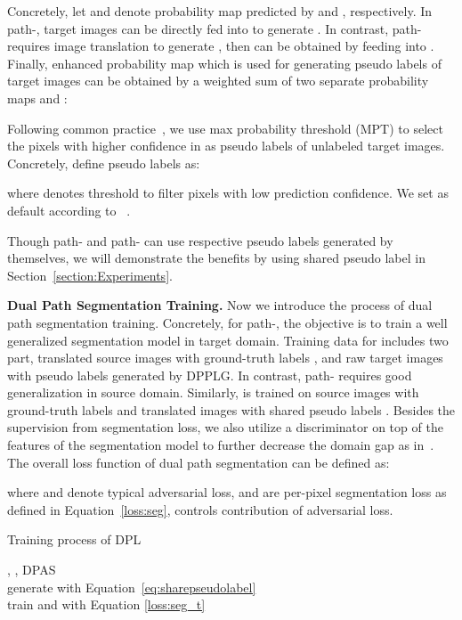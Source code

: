 \documentclass[10pt,twocolumn,letterpaper]{article}
\begin{document}
Concretely, let  and  denote probability map predicted by  and , respectively. In path-, target images can be directly fed into  to generate . In contrast, path- requires image translation to generate , then  can be obtained by feeding  into . Finally, enhanced probability map  which is used for generating pseudo labels of target images can be obtained by a weighted sum of two separate probability maps  and :
\vspace{-0.2cm}

Following common practice~\cite{li2019bidirectional, Two-phase}, we use max probability threshold (MPT) to select the pixels with higher confidence in  as pseudo labels of unlabeled target images. Concretely, define pseudo labels  as:
\vspace{-0.2cm}

where  denotes threshold to filter pixels with low prediction confidence. We set  as default according to ~\cite{li2019bidirectional}.

Though path- and path- can use respective pseudo labels generated by themselves, we will demonstrate the benefits by using shared pseudo label  in Section~\ref{section:Experiments}.

{\noindent \textbf{Dual Path Segmentation Training.}}
Now we introduce the process of dual path segmentation training. Concretely, for path-, the objective is to train a well generalized segmentation model  in target domain. Training data for  includes two part, translated source images  with ground-truth labels , and raw target images  with pseudo labels  generated by DPPLG. In contrast, path- requires good generalization in source domain. Similarly,  is trained on source images  with ground-truth labels  and translated images  with shared pseudo labels . Besides the supervision from segmentation loss, we also utilize a discriminator on top of the features of the segmentation model to further decrease the domain gap as in~\cite{hoffman2018cycada, li2019bidirectional}. The overall loss function of dual path segmentation can be defined as:

where  and  denote typical adversarial loss,  and  are per-pixel segmentation loss as defined in Equation~\ref{loss:seg},  controls contribution of adversarial loss.
\vspace{-0.1cm}
\begin{algorithm}[b]
	\vspace{-0.1cm}
\caption{Training process of DPL}\label{algr:train_proc}
\begin{algorithmic}
    \Require , , 
\Ensure{, }
 DPAS\\
    \hspace{\algorithmicindent}generate  with Equation~\ref{eq:sharepseudolabel} \\
        \hspace{\algorithmicindent}train  and  with Equation \ref{loss:seg_t} 
\EndFor 
\end{algorithmic}
\end{algorithm}
\end{document}
